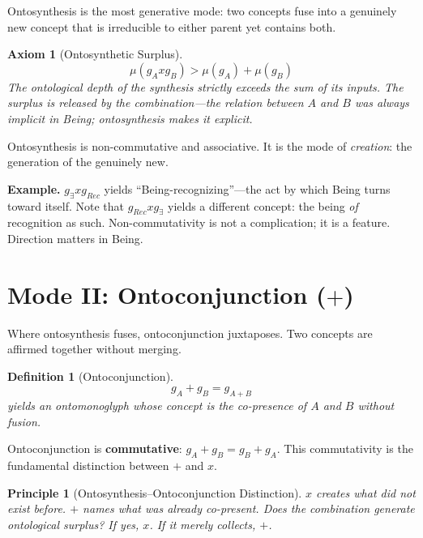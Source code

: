\documentclass[12pt, letterpaper]{book}
\def\equiv{=}%
\def\otimes{x}%
\def\oplus{+}%
\def\mathfrak#1{#1}%
\newtheorem{axiom}{Axiom}[chapter]
\newtheorem{definition}{Definition}[chapter]
\newtheorem{principle}{Principle}[chapter]
\newcommand{\E}{\exists}                          %
\begin{document}
Ontosynthesis is the most generative mode: two concepts fuse into a genuinely new concept that is irreducible to either parent yet contains both.

\begin{axiom}[Ontosynthetic Surplus]
\[
\mu(\mathfrak{g}_A \otimes \mathfrak{g}_B) > \mu(\mathfrak{g}_A) + \mu(\mathfrak{g}_B)
\]
The ontological depth of the synthesis strictly exceeds the sum of its inputs. The surplus is \textit{released} by the combination---the relation between $A$ and $B$ was always implicit in Being; ontosynthesis makes it explicit.
\end{axiom}

Ontosynthesis is non-commutative and associative. It is the mode of \textit{creation}: the generation of the genuinely new.

\textbf{Example.} $\mathfrak{g}_\E \otimes \mathfrak{g}_{Rec}$ yields ``Being-recognizing''---the act by which Being turns toward itself. Note that $\mathfrak{g}_{Rec} \otimes \mathfrak{g}_\E$ yields a different concept: the being \textit{of} recognition as such. Non-commutativity is not a complication; it is a feature. Direction matters in Being.

\section{Mode II: Ontoconjunction ($\oplus$)}

Where ontosynthesis fuses, ontoconjunction juxtaposes. Two concepts are affirmed together without merging.

\begin{definition}[Ontoconjunction]
\[
\mathfrak{g}_A \oplus \mathfrak{g}_B \equiv \mathfrak{g}_{A \oplus B}
\]
yields an ontomonoglyph whose concept is the \textit{co-presence} of $A$ and $B$ without fusion.
\end{definition}

Ontoconjunction is \textbf{commutative}: $\mathfrak{g}_A \oplus \mathfrak{g}_B \equiv \mathfrak{g}_B \oplus \mathfrak{g}_A$. This commutativity is the fundamental distinction between $\oplus$ and $\otimes$.

\begin{principle}[Ontosynthesis--Ontoconjunction Distinction]
$\otimes$ creates what did not exist before. $\oplus$ names what was already co-present. Does the combination generate ontological surplus? If yes, $\otimes$. If it merely collects, $\oplus$.
\end{principle}
\end{document}

